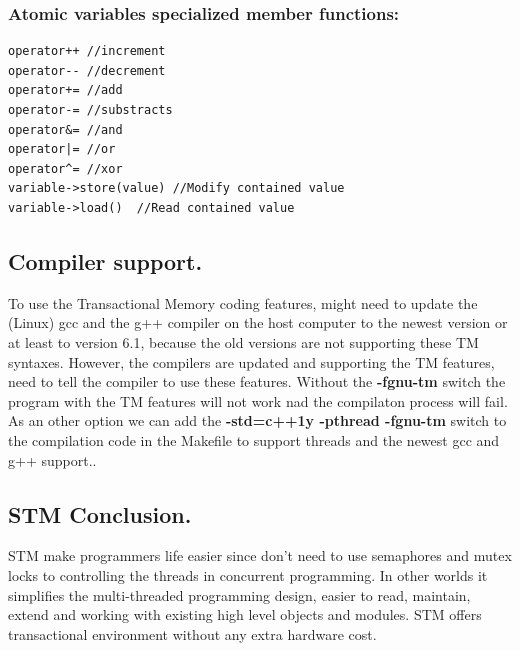 \documentclass[12pt]{article}
\begin{document}
{\setlength{\parindent}{0cm}
\subsubsection{Atomic variables specialized member functions:}
}
\begin{lstlisting}
operator++ //increment
operator-- //decrement
operator+= //add
operator-= //substracts
operator&= //and
operator|= //or
operator^= //xor
variable->store(value) //Modify contained value
variable->load()  //Read contained value
\end{lstlisting}
\subsection{Compiler support.}
To use the Transactional Memory coding features, might need to update the (Linux) gcc and the g++ compiler on the host computer to the newest version or at least to version 6.1, because the old versions are not supporting these TM syntaxes. However, the compilers are updated and supporting the TM features, need to tell the compiler to use these features. Without the  \textbf{-fgnu-tm} switch the program with the TM features will not work nad the compilaton process will fail. As an other option we can add the \textbf{-std=c++1y -pthread -fgnu-tm} switch to the compilation code in the Makefile to support threads and the newest gcc and g++ support..



\subsection{STM Conclusion.}
STM make programmers life easier since don't need to use semaphores and mutex locks to controlling the threads in concurrent programming. In other worlds it simplifies the multi-threaded programming design, easier to read, maintain, extend and working with existing high level objects and modules. STM offers transactional environment without any extra hardware cost. \\
\end{document}

